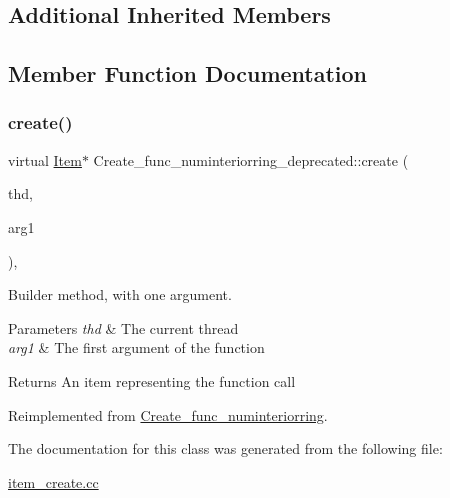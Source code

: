 \subsection*{Additional Inherited Members}


\subsection{Member Function Documentation}
\mbox{\label{classCreate__func__numinteriorring__deprecated_a7c9be02046e6dc03903ee77b2f103b88}} 
\subsubsection{\texorpdfstring{create()}{create()}}
{\footnotesize\ttfamily virtual \mbox{\hyperlink{classItem}{Item}}$\ast$ Create\+\_\+func\+\_\+numinteriorring\+\_\+deprecated\+::create (\begin{DoxyParamCaption}\item[{T\+HD $\ast$}]{thd,  }\item[{\mbox{\hyperlink{classItem}{Item}} $\ast$}]{arg1 }\end{DoxyParamCaption})\hspace{0.3cm}{\ttfamily [inline]}, {\ttfamily [virtual]}}

Builder method, with one argument. 
\begin{DoxyParams}{Parameters}
{\em thd} & The current thread \\
\hline
{\em arg1} & The first argument of the function \\
\hline
\end{DoxyParams}
\begin{DoxyReturn}{Returns}
An item representing the function call 
\end{DoxyReturn}


Reimplemented from \mbox{\hyperlink{classCreate__func__numinteriorring_a2a90d2b7363055fd384130f09e5bc5c6}{Create\+\_\+func\+\_\+numinteriorring}}.



The documentation for this class was generated from the following file\+:\begin{DoxyCompactItemize}
\item 
\mbox{\hyperlink{item__create_8cc}{item\+\_\+create.\+cc}}\end{DoxyCompactItemize}
